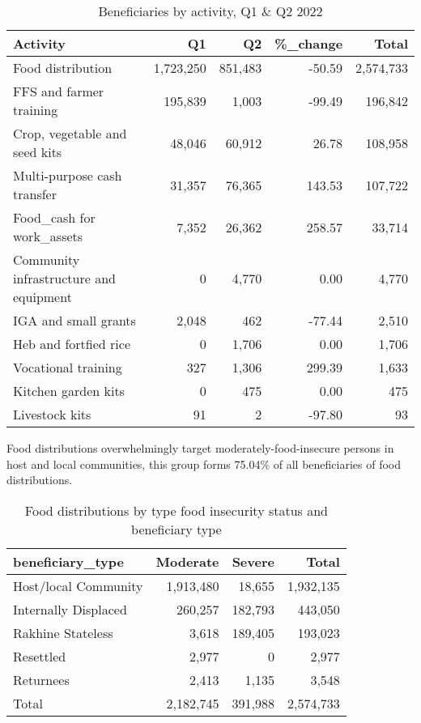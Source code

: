 \documentclass[
]{article}
\begin{document}
\begin{table}

\caption{\label{tab:table-activity}Beneficiaries by activity, Q1 & Q2 2022}
\centering
\begin{tabular}[t]{l|r|r|r|r}
\hline
Activity & Q1 & Q2 & \%\_change & Total\\
\hline
Food distribution & 1,723,250 & 851,483 & -50.59 & 2,574,733\\
\hline
FFS and farmer training & 195,839 & 1,003 & -99.49 & 196,842\\
\hline
Crop, vegetable and seed kits & 48,046 & 60,912 & 26.78 & 108,958\\
\hline
Multi-purpose cash transfer & 31,357 & 76,365 & 143.53 & 107,722\\
\hline
Food\_cash for work\_assets & 7,352 & 26,362 & 258.57 & 33,714\\
\hline
Community infrastructure and equipment & 0 & 4,770 & 0.00 & 4,770\\
\hline
IGA and small grants & 2,048 & 462 & -77.44 & 2,510\\
\hline
Heb and fortfied rice & 0 & 1,706 & 0.00 & 1,706\\
\hline
Vocational training & 327 & 1,306 & 299.39 & 1,633\\
\hline
Kitchen garden kits & 0 & 475 & 0.00 & 475\\
\hline
Livestock kits & 91 & 2 & -97.80 & 93\\
\hline
\end{tabular}
\end{table}

Food distributions overwhelmingly target moderately-food-insecure
persons in host and local communities, this group forms 75.04\% of all
beneficiaries of food distributions.

\begin{table}

\caption{\label{tab:food-distributions-fs-status}Food distributions by type food insecurity status and beneficiary type}
\centering
\begin{tabular}[t]{l|r|r|r}
\hline
beneficiary\_type & Moderate & Severe & Total\\
\hline
Host/local Community & 1,913,480 & 18,655 & 1,932,135\\
\hline
Internally Displaced & 260,257 & 182,793 & 443,050\\
\hline
Rakhine Stateless & 3,618 & 189,405 & 193,023\\
\hline
Resettled & 2,977 & 0 & 2,977\\
\hline
Returnees & 2,413 & 1,135 & 3,548\\
\hline
Total & 2,182,745 & 391,988 & 2,574,733\\
\hline
\end{tabular}
\end{table}
\end{document}
